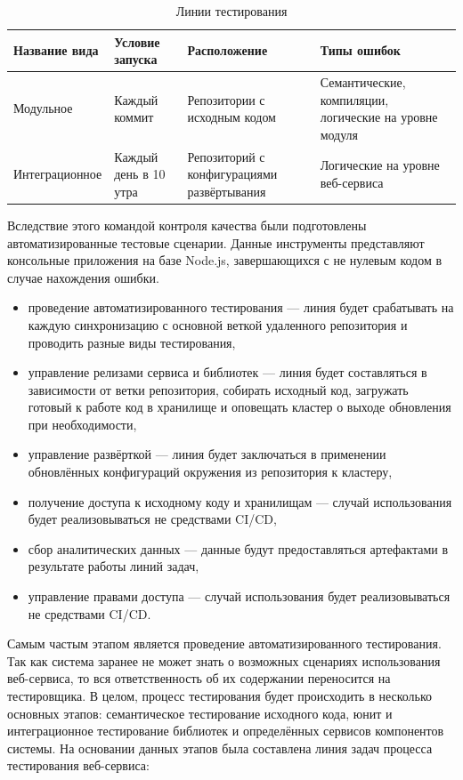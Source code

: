 \begin{center}
    \begin{longtable}{|p{}|p{}|p{}|p{}|}
        \caption{Линии тестирования}
        \label{tab:test-kinds}
        \hline
        Название вида   & Условие запуска       & Расположение                                  & Типы ошибок   \\
        \hline
        Модульное       & Каждый коммит         & Репозитории с исходным кодом                  & Семантические, компиляции, логические на уровне модуля    \\
        Интеграционное  & Каждый день в 10 утра & Репозиторий с конфигурациями развёртывания    & Логические на уровне веб-сервиса                          \\
        \hline
    \end{longtable}
\end{center}

Вследствие этого командой контроля качества были подготовлены автоматизированные тестовые сценарии.
Данные инструменты представляют консольные приложения на базе Node.js,
завершающихся с не нулевым кодом в случае нахождения ошибки.

\begin{itemize}
    \item проведение автоматизированного тестирования --- линия будет срабатывать на каждую синхронизацию с основной веткой удаленного репозитория и проводить разные виды тестирования,
    \item управление релизами сервиса и библиотек --- линия будет составляться в зависимости от ветки репозитория, собирать исходный код, загружать готовый к работе код в хранилище и
    оповещать кластер о выходе обновления при необходимости,
    \item управление развёрткой --- линия будет заключаться в применении обновлённых конфигураций окружения из репозитория к кластеру,
    \item получение доступа к исходному коду и хранилищам --- случай использования будет реализовываться не средствами CI/CD,
    \item сбор аналитических данных --- данные будут предоставляться артефактами в результате работы линий задач,
    \item управление правами доступа --- случай использования будет реализовываться не средствами CI/CD.
\end{itemize}

Самым частым этапом является проведение автоматизированного тестирования.
Так как система заранее не может знать о возможных сценариях использования веб-сервиса, то вся ответственность об их содержании переносится на тестировщика.
В целом, процесс тестирования будет происходить в несколько основных этапов: семантическое тестирование исходного кода, юнит и интеграционное тестирование библиотек и
определённых сервисов компонентов системы.
На основании данных этапов была составлена линия задач процесса тестирования веб-сервиса:

